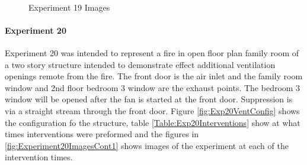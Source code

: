 \documentclass{article}
\begin{document}
\begin{figure}[H]
	\ContinuedFloat 
	\centering 
	 \ 
	\caption{Experiment 19 Images}
	\label{fig:Experiment19ImagesCont3} 
\end{figure}

\paragraph{Experiment 20}\mbox{}

Experiment 20 was intended to represent a fire in open floor plan family room of a two story structure intended to demonstrate effect additional ventilation openings remote from the fire. The front door is the air inlet and the family room window and 2nd floor bedroom 3 window are the exhaust points. The bedroom 3 window will be opened after the fan is started at the front door. Suppression is via a straight stream through the front door. Figure \ref{fig:Exp20VentConfig} shows the configuration fo the structure, table \ref{Table:Exp20Interventions} show at what times interventions were preformed and the figures in \ref{fig:Experiment20ImagesCont1} shows images of the experiment at each of the intervention times.
\end{document}
